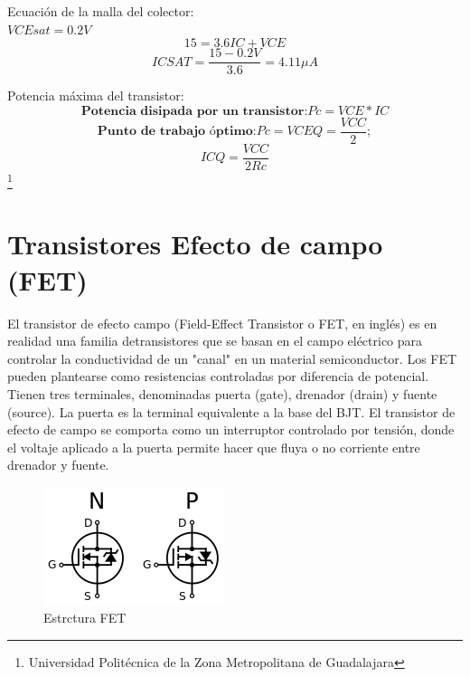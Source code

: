 \documentclass[10pt,a4paper]{article}
\begin{document}
Ecuación de la malla del colector:\\
$  VCEsat = 0.2V $
\begin{equation}
15 = 3.6IC + VCE
\end{equation}
\begin{equation}
ICSAT = \frac{15 - 0.2V}{3.6} = 4.11\mu A
\end{equation}

Potencia máxima del transistor:\\
\begin{equation}
\textbf{Potencia disipada por un transistor:}
Pc = VCE * IC
\end{equation}
\begin{equation}
\textbf{Punto de trabajo óptimo:}
Pc = VCEQ = \frac{VCC}{2};
\end{equation}
\begin{equation}
ICQ = \frac{VCC}{2Rc}
\end{equation}
\footnote{Universidad Politécnica de la Zona Metropolitana de Guadalajara}

\newpage
\section{Transistores Efecto de campo (FET)}
 El transistor de efecto campo (Field-Effect Transistor o FET, en inglés) es en realidad una familia detransistores que se basan en el campo eléctrico para controlar la conductividad de un "canal" en un material semiconductor. Los FET pueden plantearse como resistencias controladas por diferencia de potencial.\\
Tienen tres terminales, denominadas puerta (gate), drenador (drain) y fuente (source). La puerta es la terminal equivalente a la base del BJT. El transistor de efecto de campo se comporta como un interruptor controlado por tensión, donde el voltaje aplicado a la puerta permite hacer que fluya o no corriente entre drenador y fuente.\\
\begin{figure}[hbtp]
\centering
\includegraphics[scale=0.75]{imagenes/JFET.png}
\caption{Estrctura FET}
\end{figure}
\end{document}
